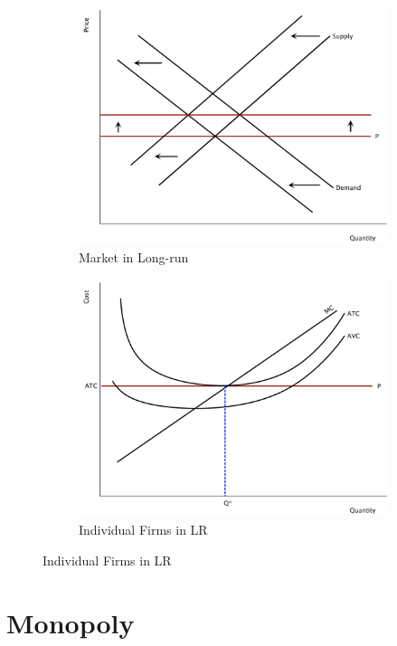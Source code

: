 \documentclass[11pt]{article}\usepackage[]{graphicx}\usepackage[]{color}
\theoremstyle{definition}
\begin{document}
\begin{figure}[ht]
	\begin{subfigure}[b]{0.5\textwidth}
		\centering
		\includegraphics[scale=.30]{plot72.pdf}
		\caption{Market in Long-run}
	\end{subfigure}
	\begin{subfigure}[b]{0.5\textwidth}
		\centering
		\includegraphics[scale=.30]{plot68.pdf}
		\caption{Individual Firms in LR}
	\end{subfigure}
\end{figure}

\newpage	
	
	\section{Monopoly}
	
\end{document}
